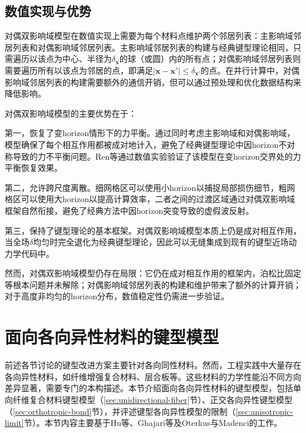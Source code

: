 \subsection{数值实现与优势}\label{sec:dh-implementation}

对偶双影响域模型在数值实现上需要为每个材料点维护两个邻居列表：主影响域邻居列表和对偶影响域邻居列表。主影响域邻居列表的构建与经典键型理论相同，只需遍历以该点为中心、半径为$\delta_{\mathbf{x}}$的球（或圆）内的所有点；对偶影响域邻居列表则需要遍历所有以该点为邻居的点，即满足$|\mathbf{x}-\mathbf{x}'|\le\delta_{\mathbf{x}'}$的点。在并行计算中，对偶影响域邻居列表的构建需要额外的通信开销，但可以通过预处理和优化数据结构来降低影响。

对偶双影响域模型的主要优势在于：

第一，恢复了变horizon情形下的力平衡。通过同时考虑主影响域和对偶影响域，模型确保了每个相互作用都被成对地计入，避免了经典键型理论中因horizon不对称导致的力不平衡问题。Ren等\cite{Ren2017dualhorizon}通过数值实验验证了该模型在变horizon交界处的力平衡恢复效果。

第二，允许跨尺度离散。细网格区可以使用小horizon以捕捉局部损伤细节，粗网格区可以使用大horizon以提高计算效率，二者之间的过渡区域通过对偶双影响域框架自然衔接，避免了经典方法中因horizon突变导致的虚假波反射。

第三，保持了键型理论的基本框架。对偶双影响域模型本质上仍是成对相互作用，当全场$\delta$均匀时完全退化为经典键型理论，因此可以无缝集成到现有的键型近场动力学代码中。

然而，对偶双影响域模型仍存在局限：它仍在成对相互作用的框架内，泊松比固定等根本问题并未解除；对偶影响域邻居列表的构建和维护带来了额外的计算开销；对于高度非均匀的horizon分布，数值稳定性仍需进一步验证。


\section{面向各向异性材料的键型模型}\label{sec:anisotropic-bond}

前述各节讨论的键型改进方案主要针对各向同性材料。然而，工程实践中大量存在各向异性材料，如纤维增强复合材料、层合板等。这些材料的力学性能沿不同方向差异显著，需要专门的本构描述。本节介绍面向各向异性材料的键型模型，包括单向纤维复合材料键型模型（\ref{sec:unidirectional-fiber}节）、正交各向异性键型模型（\ref{sec:orthotropic-bond}节），并评述键型各向异性模型的限制（\ref{sec:anisotropic-limit}节）。本节内容主要基于Hu等\cite{HuHaBobaru2012}、Ghajari等\cite{Ghajari2014}及Oterkus与Madenci\cite{OterkusMadenci2012}的工作。

